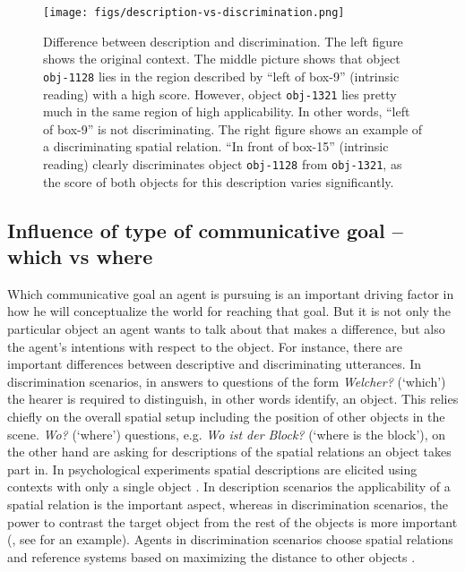 \begin{figure}
\begin{centering}
\texttt{[image: figs/description-vs-discrimination.png]}
\end{centering}
\caption[Difference between discrimination and description]
{Difference between description and discrimination. The left figure
shows the original context. The middle picture shows that
object {\footnotesize\tt obj-1128} lies in the region described by ``left of box-9'' 
(intrinsic reading) with a high score. However, object {\footnotesize\tt obj-1321}
lies pretty much in the same region of high applicability. In other words,
``left of box-9'' is not discriminating. The right figure shows an example of
a discriminating spatial relation. ``In front of box-15'' (intrinsic reading) 
clearly discriminates object {\footnotesize\tt obj-1128} from {\footnotesize\tt obj-1321},
as the score of both objects for this description varies significantly.}
\label{f:discrimination-vs-description}
\end{figure}

\subsection{Influence of type of communicative goal -- which vs where}
Which communicative goal an agent is pursuing is an important 
driving factor in how he will conceptualize the world for reaching 
that goal. But it is not only the particular object an agent wants to talk 
about that makes a difference, but also the agent's intentions with 
respect to the object. For instance, there are important differences 
between descriptive and discriminating utterances. 
In discrimination scenarios, in answers to questions 
of the form \textit{Welcher?} (`which') the hearer is required to distinguish, in 
other words identify, an object. This relies chiefly on the overall 
spatial setup including the position of other objects 
in the scene. \textit{Wo?} (`where') questions, e.g. \textit{Wo ist der Block?} (`where is the block'),  
on the other hand are asking for descriptions of the spatial relations an object takes 
part in. In psychological experiments
spatial descriptions are elicited using contexts with only a 
single object \citep{levinson2003space}. 
In description scenarios the applicability
of a spatial relation is the important aspect, 
whereas in discrimination scenarios, the power to contrast the
target object from the rest of the objects is more important 
(\citealt{tenbrink2005identifying}, see  for an example). 
Agents in discrimination scenarios choose spatial relations and
reference systems based on maximizing the distance to other objects
\citep{herskovits1986language}.


